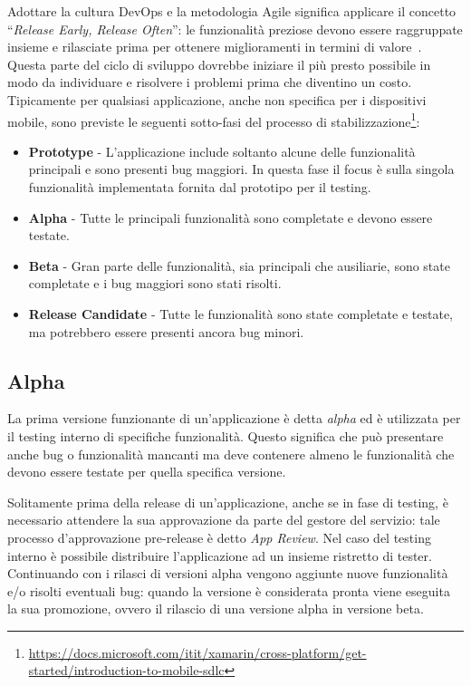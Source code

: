 Adottare la cultura DevOps e la metodologia Agile significa applicare il concetto ``\textit{Release Early, Release Often}'': le funzionalità preziose devono essere raggruppate insieme e rilasciate prima per ottenere miglioramenti in termini di valore~\cite{shore2008art}. 
Questa parte del ciclo di sviluppo dovrebbe iniziare il più presto possibile in modo da individuare e risolvere i problemi prima che diventino un costo. 
Tipicamente per qualsiasi applicazione, 
anche non specifica per i dispositivi mobile, 
sono previste le seguenti sotto-fasi del processo di stabilizzazione\footnote{\href{https://docs.microsoft.com/itit/xamarin/cross-platform/get-started/introduction-to-mobile-sdlc}{https://docs.microsoft.com/itit/xamarin/cross-platform/get-started/introduction-to-mobile-sdlc}}:

\begin{itemize}
    \item \textbf{Prototype} - L'applicazione include soltanto alcune delle funzionalità principali e sono presenti bug maggiori. In questa fase il focus è sulla singola funzionalità implementata fornita dal prototipo per il testing.
    
    \item \textbf{Alpha} - Tutte le principali funzionalità sono completate e devono essere testate.
    
    \item \textbf{Beta} - Gran parte delle funzionalità, sia principali che ausiliarie, sono state completate e i bug maggiori sono stati risolti.
    
    \item \textbf{Release Candidate} - Tutte le funzionalità sono state completate e testate, ma potrebbero essere presenti ancora bug minori.
\end{itemize}

\subsection{Alpha}
La prima versione funzionante di un'applicazione è detta \textit{alpha} ed è utilizzata per il testing interno di specifiche funzionalità.
Questo significa che può presentare anche bug o funzionalità mancanti ma deve contenere almeno le funzionalità che devono essere testate per quella specifica versione.

Solitamente prima della release di un'applicazione, 
anche se in fase di testing, 
è necessario attendere la sua approvazione da parte del gestore del servizio: tale processo d'approvazione pre-release è detto \textit{App Review}. 
Nel caso del testing interno è possibile distribuire l'applicazione ad un insieme ristretto di tester. 
Continuando con i rilasci di versioni alpha vengono aggiunte nuove funzionalità e/o risolti eventuali bug: 
quando la versione è considerata pronta viene eseguita la sua promozione, 
ovvero il rilascio di una versione alpha in versione beta.

